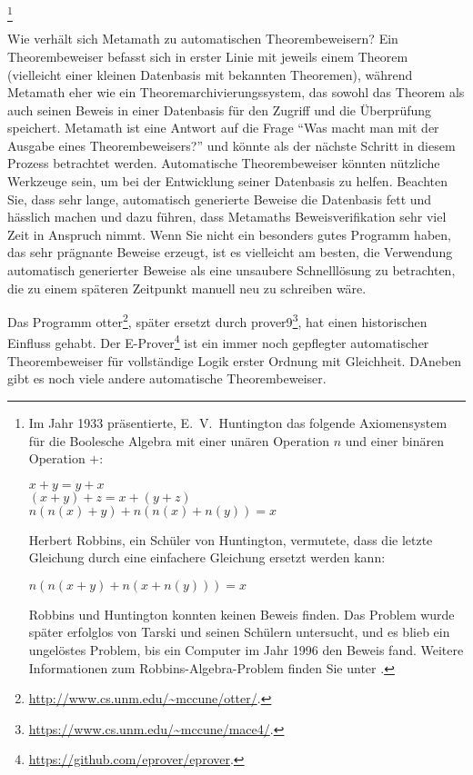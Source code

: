\footnote{Im Jahr 1933 präsentierte, E.~V.\
Huntington  das folgende Axiomensystem für die Boolesche Algebra mit einer unären Operation $n$ und einer binären Operation $+$:
\begin{center}
    $x + y = y + x$ \\
    $(x + y) + z = x + (y + z)$ \\
    $n(n(x) + y) + n(n(x) + n(y)) = x$
\end{center}
Herbert Robbins, ein Schüler von Huntington, vermutete, dass die letzte Gleichung durch eine einfachere Gleichung ersetzt werden kann:
\begin{center}
    $n(n(x + y) + n(x + n(y))) = x$
\end{center}
Robbins und Huntington konnten keinen Beweis finden.  Das Problem wurde später erfolglos von Tarski und seinen Schülern untersucht, und es blieb ein ungelöstes Problem, bis ein
Computer im Jahr 1996 den Beweis fand.  Weitere Informationen zum Robbins-Algebra-Problem finden Sie unter \cite{Wos}.}

Wie verhält sich Metamath zu automatischen Theorembeweisern?  Ein Theorembeweiser befasst sich in erster Linie mit jeweils einem Theorem (vielleicht einer kleinen Datenbasis mit bekannten Theoremen), während Metamath eher wie ein Theoremarchivierungssystem, das sowohl das Theorem als auch seinen Beweis in einer Datenbasis für den Zugriff und die Überprüfung speichert.  Metamath ist eine Antwort auf die Frage "`Was macht man mit der Ausgabe eines Theorembeweisers?"' und könnte als der nächste Schritt in diesem Prozess betrachtet werden.  Automatische Theorembeweiser könnten nützliche Werkzeuge sein, um bei der Entwicklung seiner Datenbasis zu helfen.
Beachten Sie, dass sehr lange, automatisch generierte Beweise die Datenbasis fett und hässlich machen und dazu führen, dass Metamaths Beweisverifikation sehr viel Zeit in Anspruch nimmt.  Wenn Sie nicht ein besonders gutes Programm haben, das sehr prägnante Beweise erzeugt, ist es vielleicht am besten, die Verwendung automatisch generierter Beweise als eine unsaubere Schnelllösung zu betrachten, die zu einem späteren Zeitpunkt manuell neu zu schreiben wäre.

Das Programm {\sc otter}\footnote{\url{http://www.cs.unm.edu/\~mccune/otter/}.}, später ersetzt durch prover9\footnote{\url{https://www.cs.unm.edu/~mccune/mace4/}.}, hat einen historischen Einfluss gehabt.
Der E-Prover\index{E-Prover}\footnote{\url{https://github.com/eprover/eprover}.} ist ein immer noch gepflegter automatischer Theorembeweiser für vollständige Logik erster Ordnung mit Gleichheit.
DAneben gibt es noch viele andere automatische Theorembeweiser.

